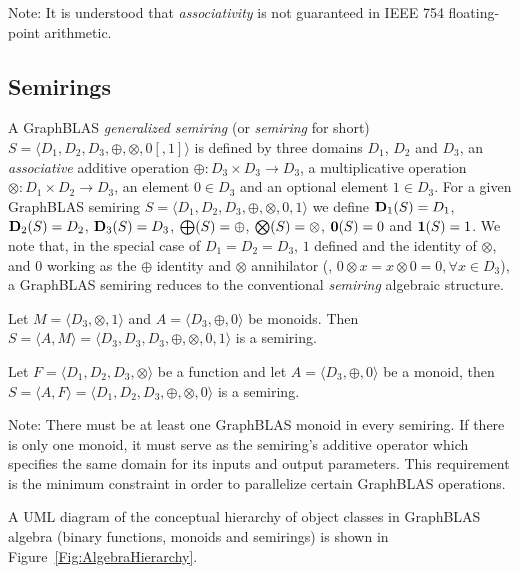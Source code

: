 Note: It is understood that \emph{associativity} is not guaranteed in IEEE 754 floating-point arithmetic.  

\subsection{Semirings}

A GraphBLAS \emph{generalized semiring} (or \emph{semiring} for short)
$S=\langle D_1,D_2,D_3,\oplus,\otimes,0 [,1] \rangle$ is defined by
three domains $D_1$, $D_2$ and $D_3$, an \emph{associative} additive operation $\oplus :
D_3 \times D_3 \rightarrow D_3$, 
a multiplicative operation $\otimes : D_1 \times D_2 \rightarrow
D_3$, an element $0 \in D_3$ and an optional element $1 \in D_3$.
For a given GraphBLAS semiring $S=\langle D_1,
D_2, D_3,\oplus,\otimes,0,1 \rangle$ we define $\bold{D}_1(S) = D_1$,
$\bold{D}_2(S) = D_2$, $\bold{D}_3(S) = D_3$, $\bold{\bigoplus}(S) =
\oplus$, $\bold{\bigotimes}(S) = \otimes$, ${\bf 0}(S) = 0$ and ${\bf 1}(S) =
1$. We note that, in the special case of $D_1 = D_2 = D_3$, $1$ defined 
and the identity of $\otimes$, and $0$ working as the $\oplus$ identity
and $\otimes$ annihilator (\ie, $0 \otimes x = x
\otimes 0 = 0, \forall x \in D_3$), a GraphBLAS semiring reduces to the
conventional \emph{semiring} algebraic structure.

Let $M = \langle D_3, \otimes,1 \rangle$ and $A = \langle D_3,\oplus,0 \rangle$ be monoids.
Then $S= \langle A,M \rangle = \langle D_3,D_3,D_3,\oplus,\otimes,0,1 \rangle$
is a semiring.

Let $F = \langle D_1,D_2,D_3,\otimes \rangle$ be a function
and let $A = \langle D_3,\oplus,0 \rangle$ be a monoid,
then $S= \langle A,F \rangle = \langle D_1,D_2,D_3,\oplus,\otimes,0 \rangle$
is a semiring.

Note: There must be at least one GraphBLAS monoid in every semiring. If there 
is only one monoid, it must serve as the semiring's additive operator which
specifies the same domain for its inputs and output parameters. This 
requirement is the minimum constraint in order to parallelize certain 
GraphBLAS operations.

A UML diagram of the conceptual hierarchy of object classes in GraphBLAS
algebra (binary functions, monoids and semirings) is shown in 
Figure~\ref{Fig:AlgebraHierarchy}.

